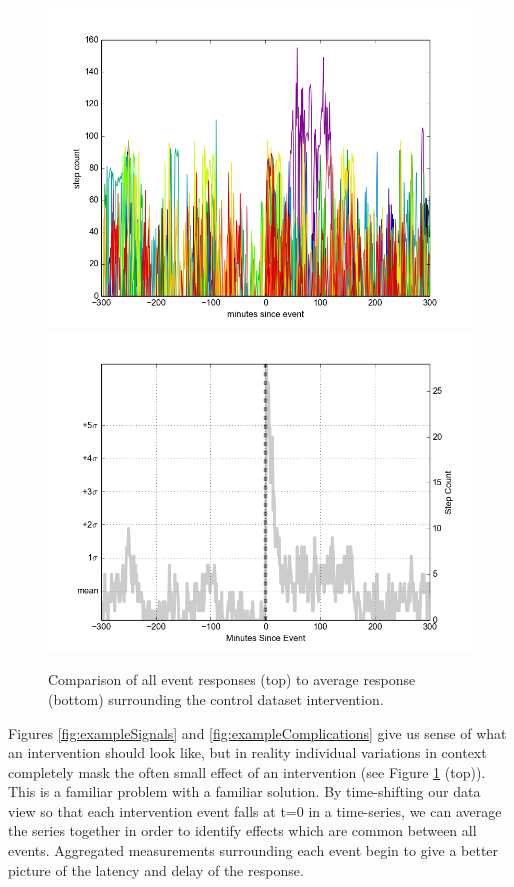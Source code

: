 \begin{figure}
\centering
\includegraphics[width=0.9\columnwidth]{./img/perfect_intervention_individual_events.png}
\includegraphics[width=0.9\columnwidth]{./img/perfect_intervention.png}
\caption{Comparison of all event responses (top) to average response (bottom) surrounding the control dataset intervention.}
\label{fig:interventionAverage}
\end{figure}

Figures \ref{fig:exampleSignals} and \ref{fig:exampleComplications} give us sense of what an intervention should look like, but in reality individual variations in context completely mask the often small effect of an intervention (see Figure \ref{fig:interventionAverage} (top)).
This is a familiar problem with a familiar solution.
By time-shifting our data view so that each intervention event falls at t=0 in a time-series, we can average the series together in order to identify effects which are common between all events.
Aggregated measurements surrounding each event begin to give a better picture of the latency and delay of the response.

